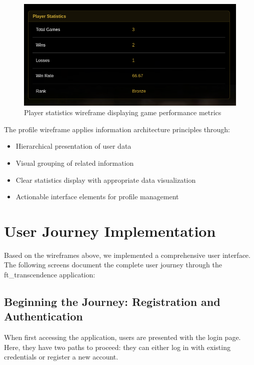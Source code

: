 \begin{figure}[H]
    \centering
    \includegraphics[width=0.7\linewidth]{Figures/images/new_images/PlayerStatisticsWithData.png}
    \caption{Player statistics wireframe displaying game performance metrics}
    \label{fig:wireframe-statistics}
\end{figure}

The profile wireframe applies information architecture principles through:
\begin{itemize}
    \item Hierarchical presentation of user data
    \item Visual grouping of related information
    \item Clear statistics display with appropriate data visualization
    \item Actionable interface elements for profile management
\end{itemize}

\section{User Journey Implementation}

Based on the wireframes above, we implemented a comprehensive user interface. The following screens document the complete user journey through the ft\_transcendence application:

\subsection{Beginning the Journey: Registration and Authentication}

When first accessing the application, users are presented with the login page. Here, they have two paths to proceed: they can either log in with existing credentials or register a new account.

